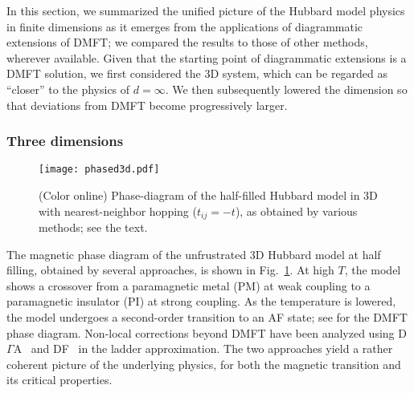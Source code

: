 \documentclass[rmp,aps,reprint,amsmath,amssymb,superscriptaddress,showpacs,nofootinbib]{revtex4-1}
\begin{document}
In this section, we summarized the unified picture of the Hubbard model physics in finite dimensions as it emerges from the applications of diagrammatic extensions of DMFT; we compared the results to those of other methods, wherever available. Given that the starting point of diagrammatic extensions is a DMFT solution, we first considered the 3D system, which can be regarded as ``closer'' to the physics of $d=\infty$. We then subsequently lowered the dimension so that deviations from DMFT become progressively larger.  

\subsubsection{Three dimensions}
\label{sec:HM3d}

\begin{figure}[t]
  \texttt{[image: phased3d.pdf]} 
    \caption{(Color online) Phase-diagram of the half-filled Hubbard model in 3D with nearest-neighbor hopping ($t_{ij}=-t$), as obtained by various methods; see the text.}
  \label{fig:pd3d}
\end{figure}

The magnetic phase diagram of the unfrustrated 3D Hubbard model at half filling, obtained by several approaches, is shown in Fig.~\ref{fig:pd3d}. At high $T$, the model shows a crossover from a paramagnetic metal (PM) at weak coupling to a paramagnetic insulator (PI) at strong coupling. As the temperature is lowered, the model undergoes a second-order transition to an AF state; see  for the DMFT phase diagram. Non-local corrections beyond DMFT have been analyzed using D$\Gamma$A~\cite{Rohringer2011} and DF~\cite{Hirschmeier2015} in the ladder approximation. The two approaches yield a rather coherent picture of the underlying physics, for both the magnetic transition and its critical properties.
\end{document}
